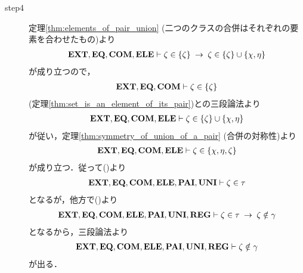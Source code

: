 \begin{sketch}
\begin{description}
			\item[step4] 定理\ref{thm:elements_of_pair_union}
				(二つのクラスの合併はそれぞれの要素を合わせたもの)より
				\begin{align}
					\mbox{{\bf EXT}},\mbox{{\bf EQ}},\mbox{\bf COM},\mbox{{\bf ELE}} \vdash 
					\zeta \in \{\zeta\} \hspace{0.25em}\rightarrow\hspace{0.25em} \zeta \in \{\zeta\} \cup \{\chi,\eta\}
				\end{align}
				が成り立つので，%
				\begin{align}
					\mbox{{\bf EXT}},\mbox{{\bf EQ}},\mbox{\bf COM} \vdash \zeta \in \{\zeta\}
				\end{align}
				(定理\ref{thm:set_is_an_element_of_its_pair})との三段論法より
				\begin{align}
					\mbox{{\bf EXT}},\mbox{{\bf EQ}},\mbox{\bf COM},\mbox{{\bf ELE}} \vdash 
					\zeta \in \{\zeta\} \cup \{\chi,\eta\}
				\end{align}
				が従い，定理\ref{thm:symmetry_of_union_of_a_pair} (合併の対称性)より
				\begin{align}
					\mbox{{\bf EXT}},\mbox{{\bf EQ}},\mbox{\bf COM},\mbox{{\bf ELE}} \vdash \zeta \in \{\chi,\eta,\zeta\}
				\end{align}
				が成り立つ．従って()より
				\begin{align}
					\mbox{{\bf EXT}},\mbox{{\bf EQ}},\mbox{\bf COM},\mbox{{\bf ELE}},\mbox{{\bf PAI}},\mbox{{\bf UNI}} \vdash \zeta \in \tau
					\label{fom:no_three_sets_go_round_20}
				\end{align}
				となるが，他方で()より
				\begin{align}
					\mbox{{\bf EXT}},\mbox{{\bf EQ}},\mbox{\bf COM},\mbox{{\bf ELE}},\mbox{{\bf PAI}},\mbox{{\bf UNI}},\mbox{{\bf REG}} \vdash 
					\zeta \in \tau \hspace{0.25em}\rightarrow\hspace{0.25em} \zeta \notin \gamma
				\end{align}
				となるから，三段論法より
				\begin{align}
					\mbox{{\bf EXT}},\mbox{{\bf EQ}},\mbox{\bf COM},\mbox{{\bf ELE}},\mbox{{\bf PAI}},\mbox{{\bf UNI}},\mbox{{\bf REG}} \vdash 
					\zeta \notin \gamma
					\label{fom:no_three_sets_go_round_21}
				\end{align}
				が出る．
				

\end{description}
\end{sketch}
